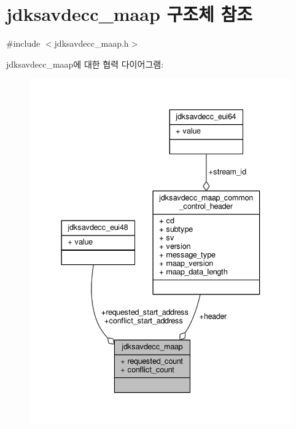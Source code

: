 \hypertarget{structjdksavdecc__maap}{}\section{jdksavdecc\+\_\+maap 구조체 참조}
\label{structjdksavdecc__maap}


{\ttfamily \#include $<$jdksavdecc\+\_\+maap.\+h$>$}



jdksavdecc\+\_\+maap에 대한 협력 다이어그램\+:
\nopagebreak
\begin{figure}[H]
\begin{center}
\leavevmode
\includegraphics[width=337pt]{structjdksavdecc__maap__coll__graph}
\end{center}
\end{figure}
